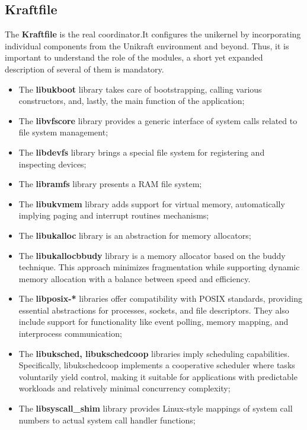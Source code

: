 \subsection{Kraftfile}
The \textbf{Kraftfile}\cite{unikraft-kraftfile} is the real coordinator.\@ It configures the unikernel by incorporating individual components from the Unikraft environment
and beyond. Thus, it is important to understand the role of the modules, a short yet expanded description of several of them is mandatory.
\begin{itemize}
    \item The \textbf{libukboot} library takes care of bootstrapping, calling various constructors, and, lastly, the main function of the application;
    \item The \textbf{libvfscore} library provides a generic interface of system calls related to file system management; 
    \item The \textbf{libdevfs} library brings a special file system for registering and inspecting devices;
    \item The \textbf{libramfs} library presents a RAM file system;
    \item The \textbf{libukvmem} library adds support for virtual memory, automatically implying paging and interrupt routines mechanisms;
    \item The \textbf{libukalloc} library is an abstraction for memory allocators;
    \item The \textbf{libukallocbbudy} library is a memory allocator based on the buddy\cite{kernel-buddy-technique} technique. This approach minimizes fragmentation while supporting dynamic memory allocation with a balance between speed and efficiency.
    \item The \textbf{libposix-*} libraries offer compatibility with POSIX standards, providing essential abstractions for processes, sockets, and file descriptors. They also include support for functionality like event polling, memory mapping, and interprocess communication;
    \item The \textbf{libuksched, libukschedcoop} libraries imply scheduling capabilities. Specifically, libukschedcoop implements a cooperative scheduler where tasks voluntarily yield control, making it suitable for applications with predictable workloads and relatively minimal concurrency complexity;
    \item The \textbf{libsyscall_shim}\cite{unikraft-syscall-shim} library provides Linux-style mappings of system call numbers to actual system call handler functions; 

\end{itemize}
